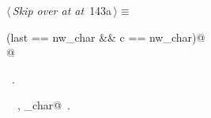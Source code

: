 \documentclass[a4paper]{report}
\begin{document}
\begin{flushleft} \small
\begin{minipage}{\linewidth}\label{scrap309}\raggedright\small
{} $\langle\,${\it Skip over at at}\nobreak\ {\footnotesize {143a}}$\,\rangle\equiv$
\vspace{-1ex}
\begin{list}{}{} \item
\mbox{}\verb@if (last == nw_char && c == nw_char)@\\
\mbox{}@\\
\mbox{}\verb@@{\NWsep}
\end{list}
\vspace{-1.5ex}
\footnotesize
\begin{list}{}{\setlength{\itemsep}{-\parsep}\setlength{\itemindent}{-\leftmargin}}
\item \NWtxtMacroRefIn\ .
\item \NWtxtIdentsUsed\nobreak\  \verb@argpop@\nobreak\ , \verb@nw_char@\nobreak\ .
\item{}
\end{list}
\end{minipage}\vspace{4ex}
\end{flushleft}
\end{document}
